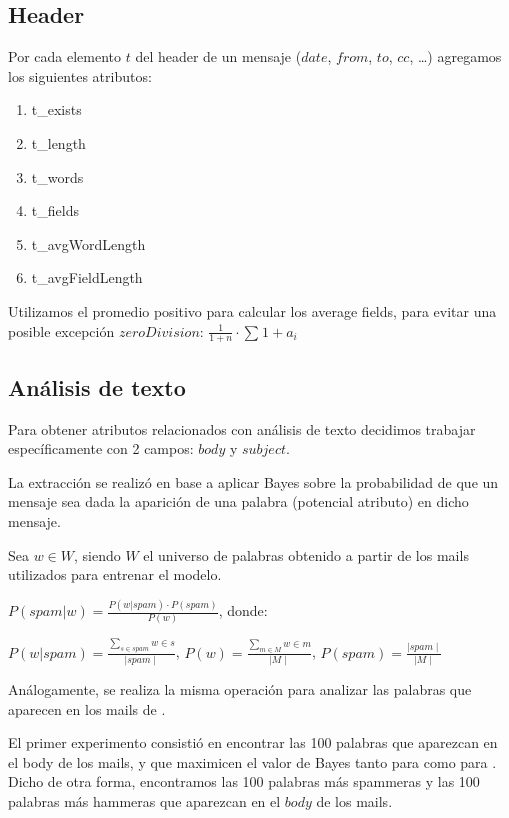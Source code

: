 \subsection{Header}

Por cada elemento \(t\) del header de un mensaje (\(date\), \(from\), \(to\), \(cc\), \ldots) agregamos los siguientes atributos:

\begin{enumerate}
  \item{t\_exists}
  \item{t\_length}
  \item{t\_words}
  \item{t\_fields}
  \item{t\_avgWordLength}
  \item{t\_avgFieldLength}
\end{enumerate}

Utilizamos el promedio positivo para calcular los average fields, para evitar una posible excepción \(zeroDivision\): $\frac{1}{1+n} \cdot \sum_{}^{}1+a_{i}$

\subsection{Análisis de texto}

Para obtener atributos relacionados con análisis de texto decidimos trabajar específicamente con 2 campos: \(body\) y \(subject\).

La extracción se realizó en base a aplicar Bayes sobre la probabilidad de que un mensaje sea \spam{} dada la aparición de una palabra (potencial atributo) en dicho mensaje.

Sea $w \in W$, siendo $W$ el universo de palabras obtenido a partir de los mails utilizados para entrenar el modelo.

\vspace{5px}
$P(spam \vert w) = \frac{P(w \vert spam) \cdot P(spam)}{P(w)}$, donde:

\vspace{5px}
$P(w \vert spam) = \frac{\sum_{s \in spam}^{} w \in s}{\mid spam \mid}$, $P(w) = \frac{\sum_{m \in M}^{} w \in m}{\mid M \mid}$, $P(spam) = \frac{\mid spam \mid}{\mid M \mid}$

\vspace{5px}
Análogamente, se realiza la misma operación para analizar las palabras que aparecen en los mails de \ham{}.

El primer experimento consistió en encontrar las 100 palabras que aparezcan en el body de los mails, y que maximicen el valor de Bayes tanto para \spam{} como
para \ham{}. Dicho de otra forma, encontramos las 100 palabras más spammeras y las 100 palabras más hammeras que aparezcan en el \(body\) de los mails.

